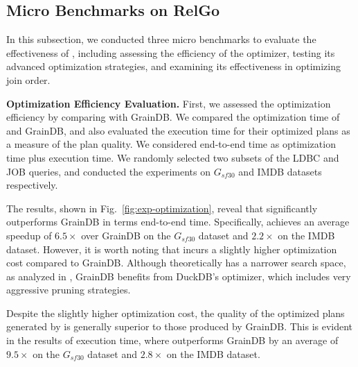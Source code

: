 \enlargethispage{1em}

\subsection{Micro Benchmarks on RelGo}
\label{sec:experiment-opt}
In this subsection, we conducted three micro benchmarks to evaluate the effectiveness of \name,
including assessing the efficiency of the optimizer, testing its advanced optimization strategies, and examining its effectiveness in optimizing join order.

\noindent\textbf{Optimization Efficiency Evaluation.}
First, we assessed the optimization efficiency by comparing \name with GrainDB\cite{graindb}.
We compared the optimization time of \name and GrainDB, and also evaluated the execution time for their optimized plans as a measure of the plan quality.
We considered end-to-end time as optimization time plus execution time.
We randomly selected two subsets of the LDBC and JOB queries, and conducted the experiments on $G_{sf30}$ and IMDB datasets respectively.

The results, shown in Fig.~\ref{fig:exp-optimization}, reveal that \name significantly outperforms GrainDB in terms end-to-end time.
Specifically, \name achieves an average speedup of $6.5\times$ over GrainDB on the $G_{sf30}$ dataset and $2.2\times$ on the IMDB dataset.
However, it is worth noting that \name incurs a slightly higher optimization cost compared to GrainDB. Although \name theoretically has a narrower search space, as analyzed in , GrainDB benefits from DuckDB's optimizer, which includes very aggressive pruning strategies.

Despite the slightly higher optimization cost, the quality of the optimized plans generated by \name is generally superior to those produced by GrainDB. This is evident in the results of execution time, where \name outperforms GrainDB by an average of $9.5\times$ on the $G_{sf30}$ dataset and $2.8\times$ on the IMDB dataset. %

